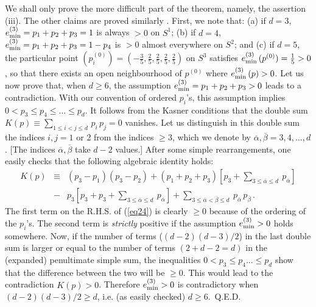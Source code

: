 \documentclass[a4paper,12pt]{article}
\begin{document}
We shall only prove the more difficult part of the theorem, namely,
the assertion (iii).  The other claims are proved similarly \cite{dh2}.
First,
we note that: (a) if $d=3$, $e_{{\rm min}}^{(3)} = p_1 + p_2 + p_3 = 1$ 
is always $>0$ on $S^1$; (b) if $d=4$, $e_{{\rm min}}^{(3)} = p_1 + p_2 
+ p_3 = 1 - p_4$ is $>0$ almost everywhere on $S^2$;
and (c) if $d=5$, the particular point $(p_i^{(0)}) 
= \left( - \frac{3}{5} , \frac{2}{5} , \frac{2}{5} , \frac{2}{5} , 
\frac{2}{5} \right)$ on $S^3$ satisfies $e_{{\rm min}}^{(3)} \, 
(p^{(0)}) = \frac{1}{5} > 0$, so that there exists an open neighbourhood 
of $p^{(0)}$ where $e_{{\rm min}}^{(3)} \, (p) > 0$. Let us now prove 
that, when $d \geq 6$, the assumption $e_{{\rm min}}^{(3)} = p_1 + p_2 
+ p_3 > 0$ leads to a contradiction. With our convention of ordered 
$p_i$'s, this assumption implies $0 < p_3 \leq p_4 \leq \ldots \leq 
p_d$.  It follows from the Kasner conditions that the
double sum 
$K (p) \equiv \sum_{1 \leq i < j \leq d} \, p_i \, p_j = 0$ 
vanishes.
Let us distinguish in this double sum the indices 
$i,j = 1$ or 2 from the indices $\geq 3$, which we denote by 
$\overline{\alpha} , \overline{\beta} = 3, 4, \ldots , d$. [The indices 
$\overline{\alpha} , \overline{\beta}$ take $d-2$ values.] After 
some simple 
rearrangements, one easily checks that the following algebraic identity 
holds:
\begin{eqnarray}
K(p) &\equiv& (p_3 - p_1) (p_3 - p_2) + (p_1 + p_2 + p_3) \left[ p_3 + 
\sum_{3 \leq \overline{\alpha} \leq d} \ p_{\overline{\alpha}} \right] 
\nonumber \\
&-& p_3 \left[ p_3 + p_3 + \sum_{3 \leq \overline{\alpha} \leq d} \ 
p_{\overline{\alpha}} \right] + \sum_{3 \leq \overline{\alpha} < 
\overline{\beta} \leq d} \ p_{\overline{\alpha}} \, 
p_{\overline{\beta}} \, . \label{eq24}
\end{eqnarray}
The first term on the R.H.S. of (\ref{eq24}) is clearly $\geq 0$ 
because of the ordering of the $p_i$'s. The second term is {\it 
strictly} positive if the assumption $e_{{\rm min}}^{(3)} > 0$ holds 
somewhere. Now, if the number of terms ($(d-2) (d-3)/2$) in the 
last double sum is larger or equal to the number of terms $(2+d-2=d)$ 
in the (expanded) penultimate simple sum, the inequalities $0 < p_3 
\leq p_4 \ldots \leq p_d$ show that the difference between the two will 
be $\geq 0$. This would lead to the contradiction $K(p) > 0$. Therefore 
$e_{{\rm min}}^{(3)} > 0$ is contradictory when $(d-2)(d-3) / 2 \geq d$, 
i.e. (as easily checked) $d \geq 6$.~Q.E.D.
\end{document}
